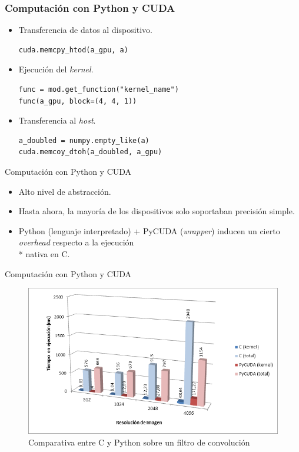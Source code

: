 \documentclass{beamer}
\begin{document}
\begin{frame}[fragile]
\frametitle{Computación con Python y CUDA}
  \begin{itemize}
    \item Transferencia de datos al dispositivo.
    \begin{lstlisting}
cuda.memcpy_htod(a_gpu, a)
    \end{lstlisting}
   
    \item Ejecución del \emph{kernel}.
    \begin{lstlisting}
func = mod.get_function("kernel_name")
func(a_gpu, block=(4, 4, 1))
    \end{lstlisting}

    \item Transferencia al \emph{host}.
    \begin{lstlisting}
a_doubled = numpy.empty_like(a)
cuda.memcoy_dtoh(a_doubled, a_gpu)
    \end{lstlisting}

  \end{itemize}
\end{frame}

\begin{frame}{Computación con Python y CUDA}
  \begin{itemize}
    \item Alto nivel de abstracción.
    \item Hasta ahora, la mayoría de los dispositivos solo soportaban precisión simple.
    \item Python (lenguaje interpretado) + PyCUDA (\emph{wrapper}) inducen un cierto \emph{overhead} respecto a la ejecución \\* nativa en C.
  \end{itemize}
\end{frame}


\begin{frame}{Computación con Python y CUDA}
  \begin{figure}
    \begin{center}
      \includegraphics[width=.8\textwidth]{overhead-convolucion.png}
      \caption{Comparativa entre C y Python sobre un filtro de convolución}
    \end{center}
  \end{figure}
\end{frame}
\end{document}
